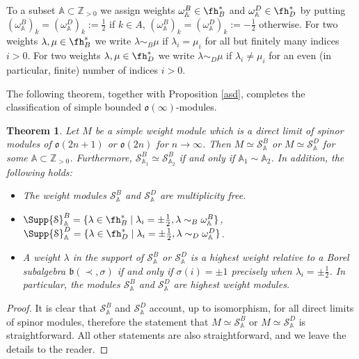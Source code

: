 \documentclass[12pt]{amsart}
\def\gb{\mathfrak{b}}
\newtheorem{thm}{Theorem}[section]
\begin{document}
To a subset ${\mathbb A} \subset \mathbb{Z}_{>0}$  we assign weights  $\omega_{\mathbb A}^B \in \fh_B^*$ and  $\omega_{\mathbb A}^D \in \fh_D^*$ by putting $(\omega_{\mathbb A}^B)_k = (\omega_{\mathbb A}^D)_k := \frac{1}{2}$ if $k \in A$, $(\omega_{\mathbb A}^B)_k = (\omega_{\mathbb A}^D)_k := -\frac{1}{2}$ otherwise. For two  weights $\lambda,\mu \in \fh_B^*$  we write $\lambda\sim_{B} \mu$ if $\lambda_i = \mu_i$ for all but finitely many indices $i>0$.
 For two weights $\lambda,\mu\in \fh_D^*$  we write $\lambda\sim_{D} \mu$ if $\lambda_i \neq \mu_i$ for an even (in particular, finite) number of  indices $i>0$.


The following theorem, together with Proposition \ref{asd}, completes the classification of simple bounded $\mathfrak{o}(\infty)$-modules.


\begin{thm}\label{th1} Let $M$ be a simple weight module which is a direct limit of spinor modules of $\mathfrak{o}(2n+1)$ or $\mathfrak{o}(2n)$ for $n\to \infty$. Then $M\simeq \mathcal S_{\mathbb A}^B$ or $M\simeq \mathcal S_{\mathbb A}^D$ for some ${\mathbb A} \subset\mathbb{Z}_{>0}$.
 Furthermore,  ${\mathcal S}_{{\mathbb A}_1}^B \simeq {\mathcal S}_{{\mathbb A}_2}^B$ if and only if ${\mathbb A}_1 \sim {\mathbb A}_2$. In addition, the following holds:
\begin{itemize}
\item[(i)] The weight modules ${\mathcal S}_{\mathbb A}^B$ and ${\mathcal S}_{\mathbb A}^D$ are multiplicity free.
\item[(ii)] $\Supp {\mathcal S}_{\mathbb A}^B = \{\lambda \in \fh_B^*\; | \; \lambda_i = \pm \frac{1}{2}, \lambda \sim_B \omega_{\mathbb A}^B\}$, \, 
$\Supp {\mathcal S}_{\mathbb A}^D = \{\lambda \in \fh_D^*\; | \; \lambda_i = \pm \frac{1}{2}, \lambda \sim_D \omega_{\mathbb A}^D\}$. 
\item[(iii)] A weight $\lambda$ in the support of ${\mathcal S}_{\mathbb A}^B$ or ${\mathcal S}_{\mathbb A}^D$ is a highest weight  relative to a Borel subalgebra $\gb(\prec, \sigma)$ if and only if $\sigma(i) = \pm 1$ precisely when $\lambda_i =  \pm \frac{1}{2}$. In particular, the modules $\mathcal{S}_{\mathbb A}^B$ and $\mathcal{S}_{\mathbb A}^D$ are highest weight modules.
\end{itemize}
\end{thm}
\begin{proof}
 It is clear that $\mathcal S_{\mathbb A}^B$ and $\mathcal S_{\mathbb A}^D$ account, up to isomorphism, for all direct limits of spinor modules, therefore the statement that $M\simeq \mathcal S_{\mathbb A}^B$ or $M\simeq \mathcal S_{\mathbb A}^D$ is straightforward. All other statements are also straightforward, and we leave the details to the reader.
\end{proof}
\end{document}
